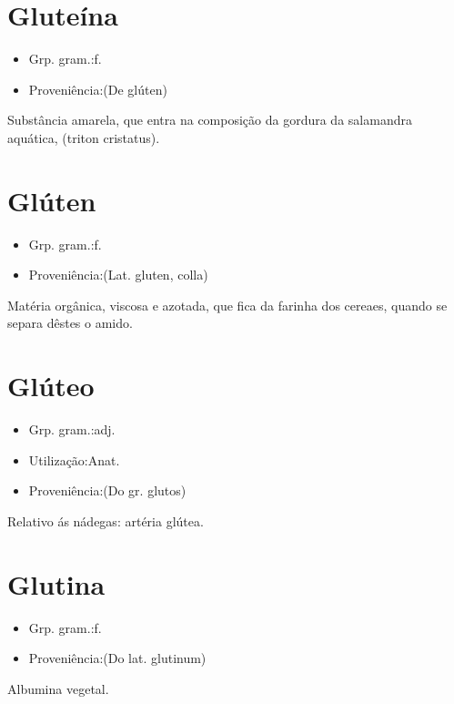 \section{Gluteína}
\begin{itemize}
\item {Grp. gram.:f.}
\end{itemize}
\begin{itemize}
\item {Proveniência:(De \textunderscore glúten\textunderscore )}
\end{itemize}
Substância amarela, que entra na composição da gordura da salamandra aquática, (\textunderscore triton cristatus\textunderscore ).
\section{Glúten}
\begin{itemize}
\item {Grp. gram.:f.}
\end{itemize}
\begin{itemize}
\item {Proveniência:(Lat. \textunderscore gluten\textunderscore , colla)}
\end{itemize}
Matéria orgânica, viscosa e azotada, que fica da farinha dos cereaes, quando se separa dêstes o amido.
\section{Glúteo}
\begin{itemize}
\item {Grp. gram.:adj.}
\end{itemize}
\begin{itemize}
\item {Utilização:Anat.}
\end{itemize}
\begin{itemize}
\item {Proveniência:(Do gr. \textunderscore glutos\textunderscore )}
\end{itemize}
Relativo ás nádegas: \textunderscore artéria glútea\textunderscore .
\section{Glutina}
\begin{itemize}
\item {Grp. gram.:f.}
\end{itemize}
\begin{itemize}
\item {Proveniência:(Do lat. \textunderscore glutinum\textunderscore )}
\end{itemize}
Albumina vegetal.
